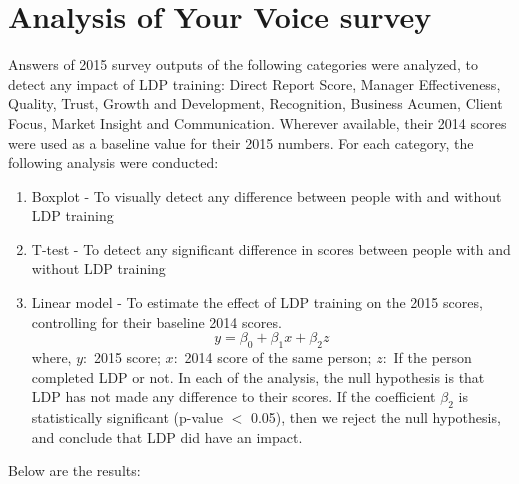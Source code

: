 \documentclass[11pt]{extarticle} %
\begin{document}
\section{Analysis of Your Voice survey}
Answers of 2015 survey outputs of the following categories were analyzed, to detect any impact of LDP training:
Direct Report Score, Manager Effectiveness, Quality, Trust, Growth and Development, Recognition, Business Acumen, Client Focus, Market Insight and  Communication. Wherever available, their 2014 scores were used as a baseline value for their 2015 numbers. For each category, the following analysis were conducted:
\begin{enumerate}
\item Boxplot - To visually detect any difference between people with and without LDP training
\item T-test - To detect any significant difference in scores between people with and without LDP training
\item Linear model - To estimate the effect of LDP training on the 2015 scores, controlling for their baseline 2014 scores. 
\[ y = \beta_0 + \beta_1 x + \beta_2 z\]
where, $y: $ 2015 score; $x: $ 2014 score of the same person; $z: $ If the person completed LDP or not. In each of the analysis, the null hypothesis is that LDP has not made any difference to their scores. If the coefficient $\beta_2$ is statistically significant (p-value $<$ 0.05), then we reject the null hypothesis, and conclude that LDP did have an impact. 

\end{enumerate}
Below are the results: \\
\end{document}
